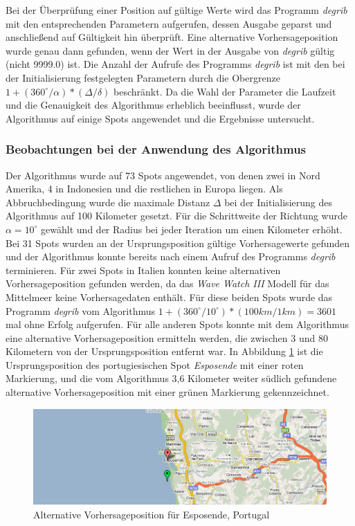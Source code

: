 Bei der Überprüfung einer Position auf gültige Werte wird das Programm
\textit{degrib} mit den entsprechenden Parametern aufgerufen, dessen
Ausgabe geparst und anschließend auf Gültigkeit hin überprüft. Eine
alternative Vorhersageposition wurde genau dann gefunden, wenn der
Wert in der Ausgabe von \textit{degrib} gültig (nicht 9999.0) ist. Die
Anzahl der Aufrufe des Programms \textit{degrib} ist mit den bei der
Initialisierung festgelegten Parametern durch die Obergrenze $1 +
(360^{\circ} / \alpha) * (\Delta / \delta)$ beschränkt. Da die Wahl
der Parameter die Laufzeit und die Genauigkeit des Algorithmus
erheblich beeinflusst, wurde der Algorithmus auf einige Spots
angewendet und die Ergebnisse untersucht.

\subsubsection{Beobachtungen bei der Anwendung des Algorithmus}
Der Algorithmus wurde auf 73 Spots angewendet, von denen zwei in Nord
Amerika, 4 in Indonesien und die restlichen in Europa liegen. Als
Abbruchbedingung wurde die maximale Distanz $\Delta$ bei der
Initialisierung des Algorithmus auf 100 Kilometer gesetzt. Für die
Schrittweite der Richtung wurde $\alpha = 10^{\circ}$ gewählt und der
Radius bei jeder Iteration um einen Kilometer erhöht. Bei 31 Spots
wurden an der Ursprungsposition gültige Vorhersagewerte gefunden und
der Algorithmus konnte bereits nach einem Aufruf des Programms
\textit{degrib} terminieren. Für zwei Spots in Italien konnten keine
alternativen Vorhersageposition gefunden werden, da das \textit{Wave
  Watch III} Modell für das Mittelmeer keine Vorhersagedaten
enthält. Für diese beiden Spots wurde das Programm \textit{degrib} vom
Algorithmus $1 + (360^{\circ} / 10^{\circ}) * (100km / 1km) = 3601$
mal ohne Erfolg aufgerufen. Für alle anderen Spots konnte mit dem
Algorithmus eine alternative Vorhersageposition ermitteln werden, die
zwischen 3 und 80 Kilometern von der Ursprungsposition entfernt
war. In Abbildung \ref{locate-esposende} ist die Ursprungsposition des
portugiesischen Spot \textit{Esposende} mit einer roten Markierung,
und die vom Algorithmus 3,6 Kilometer weiter südlich gefundene
alternative Vorhersageposition mit einer grünen Markierung
gekennzeichnet.

\begin{figure}[h]
  \begin{center}
    \includegraphics[width=\textwidth]{bilder/locate-esposende}
    \caption{Alternative Vorhersageposition für Esposende, Portugal}
    \label{locate-esposende}
  \end{center}
\end{figure}

